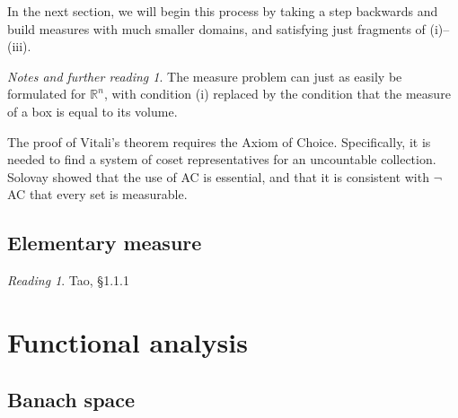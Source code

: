 \documentclass[11pt,oneside]{amsbook}
\newcommand{\RR}{\mathbb R}
\theoremstyle{definition}
\theoremstyle{plain}
\theoremstyle{definition}
\theoremstyle{remark}
\newtheorem*{notes}{Notes and further reading}
\newtheorem*{reading}{Reading}
\numberwithin{equation}{section}
\numberwithin{figure}{section}
\begin{document}
In the next section, we will begin this process by taking a step backwards and build measures with much smaller domains, and satisfying just fragments of (i)--(iii).

\begin{notes}
  The measure problem can just as easily be formulated for $\RR^n$, with condition (i) replaced by the condition that the measure of a box is equal to its volume.

  The proof of Vitali's theorem requires the Axiom of Choice. Specifically, it is needed to find a system of coset representatives for an uncountable collection. Solovay showed that the use of AC is essential, and that it is consistent with $\neg$AC that every set is measurable.
\end{notes}

\section{Elementary measure}

\begin{reading}
  Tao, \S1.1.1
\end{reading}



\chapter{Functional analysis}


\section{Banach space}
\end{document}
